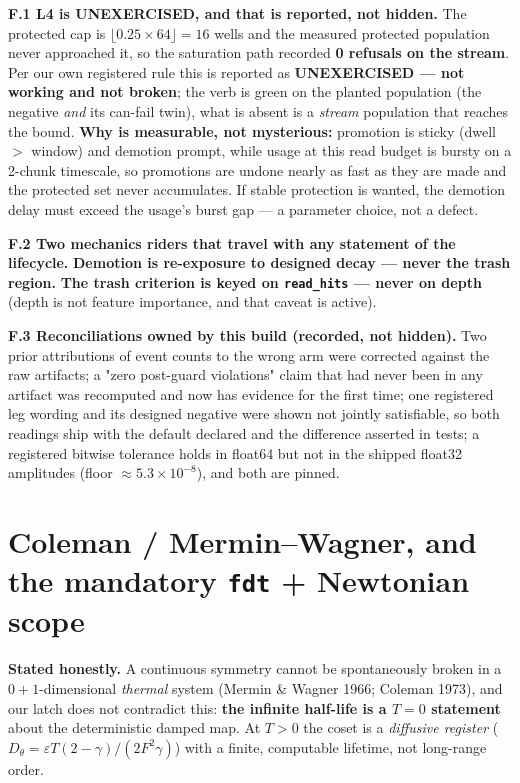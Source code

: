 \documentclass{article}
\begin{document}
\textbf{F.1 L4 is UNEXERCISED, and that is reported, not hidden.} The protected cap is $\lfloor 0.25\times64\rfloor=16$ wells and the measured protected population never approached it, so the saturation path recorded \textbf{0 refusals on the stream}. Per our own registered rule this is reported as \textbf{UNEXERCISED --- not working and not broken}; the verb is green on the planted population (the negative \emph{and} its can-fail twin), what is absent is a \emph{stream} population that reaches the bound. \textbf{Why is measurable, not mysterious:} promotion is sticky (dwell $>$ window) and demotion prompt, while usage at this read budget is bursty on a 2-chunk timescale, so promotions are undone nearly as fast as they are made and the protected set never accumulates. If stable protection is wanted, the demotion delay must exceed the usage's burst gap --- a parameter choice, not a defect.

\textbf{F.2 Two mechanics riders that travel with any statement of the lifecycle.} \textbf{Demotion is re-exposure to designed decay --- never the trash region.} \textbf{The trash criterion is keyed on \texttt{read\_hits} --- never on depth} (depth is not feature importance, and that caveat is active).

\textbf{F.3 Reconciliations owned by this build (recorded, not hidden).} Two prior attributions of event counts to the wrong arm were corrected against the raw artifacts; a "zero post-guard violations" claim that had never been in any artifact was recomputed and now has evidence for the first time; one registered leg wording and its designed negative were shown not jointly satisfiable, so both readings ship with the default declared and the difference asserted in tests; a registered bitwise tolerance holds in float64 but not in the shipped float32 amplitudes (floor $\approx5.3\times10^{-8}$), and both are pinned.

\section{Coleman / Mermin--Wagner, and the mandatory \texttt{fdt} + Newtonian scope}

\textbf{Stated honestly.} A continuous symmetry cannot be spontaneously broken in a $0{+}1$-dimensional \emph{thermal} system (Mermin \& Wagner 1966; Coleman 1973), and our latch does not contradict this: \textbf{the infinite half-life is a $T=0$ statement} about the deterministic damped map. At $T>0$ the coset is a \emph{diffusive register} ($D_\theta=\varepsilon T(2-\gamma)/(2F^2\gamma)$) with a finite, computable lifetime, not long-range order.
\end{document}
